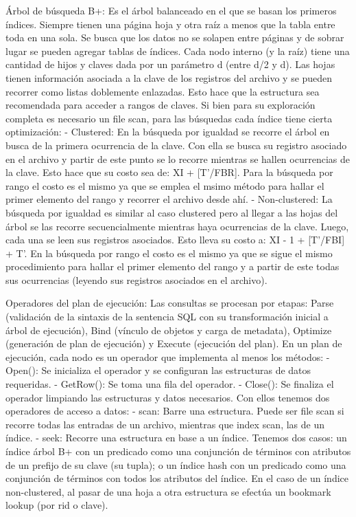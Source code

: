 Árbol de búsqueda B+: Es el árbol balanceado en el que se basan los primeros índices. Siempre tienen una página hoja y otra raíz a menos que la tabla entre toda en una sola. Se busca que los datos no se solapen entre páginas y de sobrar lugar se pueden agregar tablas de índices.
Cada nodo interno (y la raíz) tiene una cantidad de hijos y claves dada por un parámetro d (entre d/2 y d). Las hojas tienen información asociada a la clave de los registros del archivo y se pueden recorrer como listas doblemente enlazadas. Esto hace que la estructura sea recomendada para acceder a rangos de claves.
Si bien para su exploración completa es necesario un file scan, para las búsquedas cada índice tiene cierta optimización:
- Clustered: En la búsqueda por igualdad se recorre el árbol en busca de la primera ocurrencia de la clave. Con ella se busca su registro asociado en el archivo y partir de este punto se lo recorre mientras se hallen ocurrencias de la clave. Esto hace que su costo sea de: XI + [T'/FBR].
Para la búsqueda por rango el costo es el mismo ya que se emplea el msimo método para hallar el primer elemento del rango y recorrer el archivo desde ahí.
- Non-clustered: La búsqueda por igualdad es similar al caso clustered pero al llegar a las hojas del árbol se las recorre secuencialmente mientras haya ocurrencias de la clave. Luego, cada una se leen sus registros asociados. Esto lleva su costo a: XI - 1 + [T'/FBI] + T'.
En la búsqueda por rango el costo es el mismo ya que se sigue el mismo procedimiento para hallar el primer elemento del rango y a partir de este todas sus ocurrencias (leyendo sus registros asociados en el archivo).

Operadores del plan de ejecución:
Las consultas se procesan por etapas: Parse (validación de la sintaxis de la sentencia SQL con su transformación inicial a árbol de ejecución), Bind (vínculo de objetos y carga de metadata), Optimize (generación de plan de ejecución) y Execute (ejecución del plan). En un plan de ejecución, cada nodo es un operador que implementa al menos los métodos:
- Open(): Se inicializa el operador y se configuran las estructuras de datos requeridas.
- GetRow(): Se toma una fila del operador.
- Close(): Se finaliza el operador limpiando las estructuras y datos necesarios.
Con ellos tenemos dos operadores de acceso a datos:
- scan: Barre una estructura. Puede ser file scan si recorre todas las entradas de un archivo, mientras que index scan, las de un índice.
- seek: Recorre una estructura en base a un índice. Tenemos dos casos: un índice árbol B+ con un predicado como una conjunción de términos con atributos de un prefijo de su clave (su tupla); o un índice hash con un predicado como una conjunción de términos con todos los atributos del índice. En el caso de un índice non-clustered, al pasar de una hoja a otra estructura se efectúa un bookmark lookup (por rid o clave).

